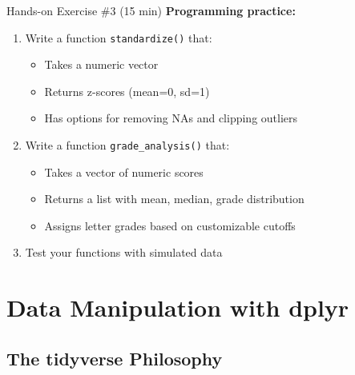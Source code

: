 \documentclass[aspectratio=169]{beamer}
\begin{document}
\begin{frame}{Hands-on Exercise \#3 (15 min)}
  \textbf{Programming practice:}
  \begin{enumerate}
    \item Write a function \texttt{standardize()} that:
      \begin{itemize}
        \item Takes a numeric vector
        \item Returns z-scores (mean=0, sd=1)
        \item Has options for removing NAs and clipping outliers
      \end{itemize}
    \item Write a function \texttt{grade\_analysis()} that:
      \begin{itemize}
        \item Takes a vector of numeric scores
        \item Returns a list with mean, median, grade distribution
        \item Assigns letter grades based on customizable cutoffs
      \end{itemize}
    \item Test your functions with simulated data
  \end{enumerate}
\end{frame}

\section{Data Manipulation with dplyr}

\subsection{The tidyverse Philosophy}
\end{document}
